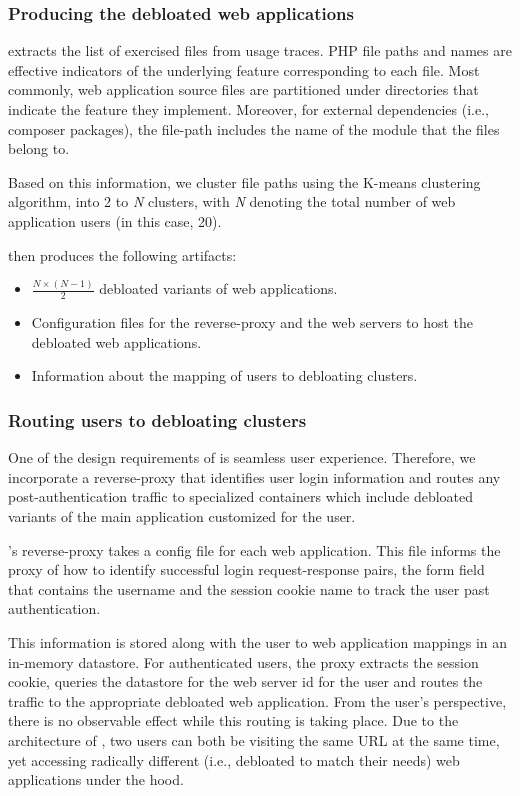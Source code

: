 \subsubsection{Producing the debloated web applications}

\sys{} extracts the list of exercised files from usage traces. 
PHP file paths and names are effective indicators of the underlying feature corresponding to each file. 
Most commonly, web application source files are partitioned under directories that indicate the feature they implement. 
Moreover, for external dependencies (i.e., composer packages), the file-path includes the name of the module that the files belong to. 

Based on this information, we cluster file paths using the K-means clustering algorithm, into 2 to \emph{N} clusters, with \emph{N} denoting the total number of web application users (in this case, 20).  

\sys{} then produces the following artifacts:
\begin{itemize}
    \item \( \frac{N \times (N - 1)}{2} \) debloated variants of web applications.
    \item Configuration files for the reverse-proxy and the web servers to host the debloated web applications.
    \item Information about the mapping of users to debloating clusters.
\end{itemize}

\subsubsection{Routing users to debloating clusters}

One of the design requirements of \sys{} is seamless user experience. 
Therefore, we incorporate a reverse-proxy that identifies user login information and routes any post-authentication traffic to specialized containers which include debloated variants of the main application customized for the user. 

\sys{}'s reverse-proxy takes a config file for each web application. 
This file informs the proxy of how to identify successful login request-response pairs, the form field that contains the username and the session cookie name to track the user past authentication. 

This information is stored along with the user to web application mappings in an in-memory datastore. 
For authenticated users, the proxy extracts the session cookie, queries the datastore for the web server id for the user and routes the traffic to the appropriate debloated web application. 
From the user's perspective, there is no observable effect while this routing is taking place. Due to the architecture of \sys{}, two users can both be visiting the same URL at the same time, yet accessing radically different (i.e., debloated to match their needs) web applications under the hood. 

